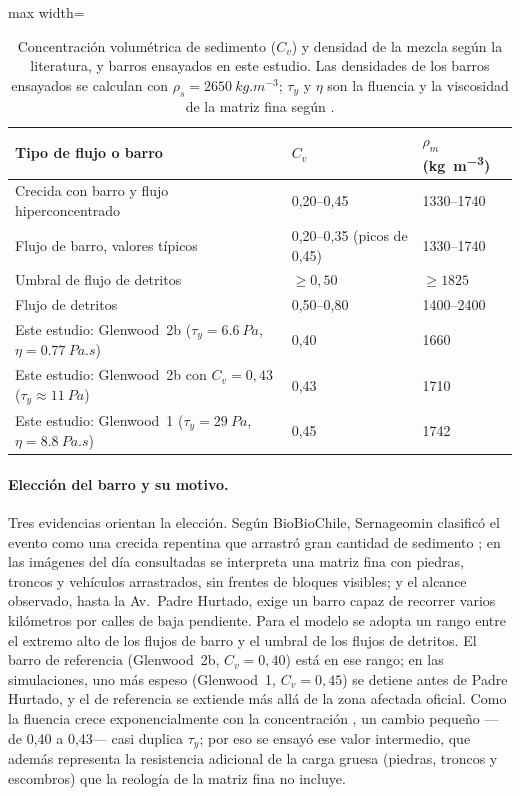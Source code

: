 \begin{table}[htbp]\centering\small
\caption{Concentración volumétrica de sedimento ($C_v$) y densidad de la mezcla según la literatura, y barros ensayados en este estudio. Las densidades de los barros ensayados se calculan con $\rho_s=\SI{2650}{kg.m^{-3}}$; $\tau_y$ y $\eta$ son la fluencia y la viscosidad de la matriz fina según \citet{obrien1988}.}\label{tab:densidades}
\begin{adjustbox}{max width=\textwidth}\begin{tabular}{lll}\toprule
Tipo de flujo o barro & $C_v$ & $\rho_m$ (\si{kg.m^{-3}})\\\midrule
Crecida con barro y flujo hiperconcentrado \citep{obrien1988,flo2d2021} & 0,20--0,45 & \numrange{1330}{1740}\\
Flujo de barro, valores típicos \citep{flo2d2021} & 0,20--0,35 (picos de 0,45) & \numrange{1330}{1740}\\
Umbral de flujo de detritos \citep{costa1984,zanuttigh2007} & $\geq0{,}50$ & $\geq\num{1825}$\\
Flujo de detritos \citep{iverson1997} & 0,50--0,80 & \numrange{1400}{2400}\\\midrule
Este estudio: Glenwood~2b ($\tau_y=\SI{6,6}{Pa}$, $\eta=\SI{0,77}{Pa.s}$) & 0,40 & \num{1660}\\
Este estudio: Glenwood~2b con $C_v=0{,}43$ ($\tau_y\approx\SI{11}{Pa}$) & 0,43 & \num{1710}\\
Este estudio: Glenwood~1 ($\tau_y=\SI{29}{Pa}$, $\eta=\SI{8,8}{Pa.s}$) & 0,45 & \num{1742}\\
\bottomrule\end{tabular}\end{adjustbox}
\end{table}

\paragraph{Elección del barro y su motivo.} Tres evidencias orientan la elección. Según BioBioChile, Sernageomin clasificó el evento como una crecida repentina que arrastró gran cantidad de sedimento \citep{biobio2026origen}; en las imágenes del día consultadas se interpreta una matriz fina con piedras, troncos y vehículos arrastrados, sin frentes de bloques visibles; y el alcance observado, hasta la Av.\ Padre Hurtado, exige un barro capaz de recorrer varios kilómetros por calles de baja pendiente. Para el modelo se adopta un rango entre el extremo alto de los flujos de barro y el umbral de los flujos de detritos. El barro de referencia (Glenwood~2b, $C_v=0{,}40$) está en ese rango; en las simulaciones, uno más espeso (Glenwood~1, $C_v=0{,}45$) se detiene antes de Padre Hurtado, y el de referencia se extiende más allá de la zona afectada oficial. Como la fluencia crece exponencialmente con la concentración \citep{obrien1988}, un cambio pequeño ---de 0,40 a 0,43--- casi duplica $\tau_y$; por eso se ensayó ese valor intermedio, que además representa la resistencia adicional de la carga gruesa (piedras, troncos y escombros) que la reología de la matriz fina no incluye.

